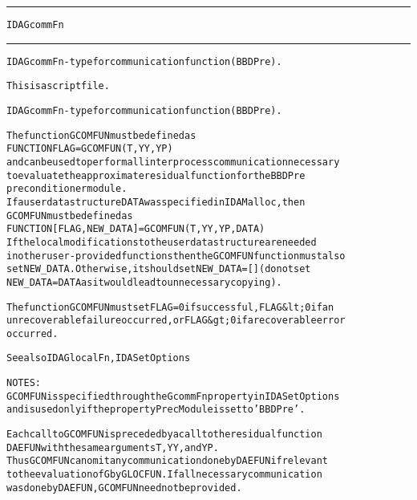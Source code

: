 \begin{samepage}
\hrule
\begin{center}
{\large \verb!IDAGcommFn!}
\label{p:IDAGcommFn}
\end{center}
\hrule\vspace{0.1in}



\begin{alltt}
IDAGcommFn - type for communication function (BBDPre).
\end{alltt}

\end{samepage}



\begin{samepage}


\begin{alltt}
This is a script file. 
\end{alltt}

\end{samepage}



\begin{alltt}
IDAGcommFn - type for communication function (BBDPre).

   The function GCOMFUN must be defined as 
        FUNCTION FLAG = GCOMFUN(T, YY, YP)
   and can be used to perform all interprocess communication necessary
   to evaluate the approximate residual function for the BBDPre
   preconditioner module.
   If a user data structure DATA was specified in IDAMalloc, then
   GCOMFUN must be defined as
        FUNCTION [FLAG, NEW_DATA] = GCOMFUN(T, YY, YP, DATA)
   If the local modifications to the user data structure are needed 
   in other user-provided functions then the GCOMFUN function must also 
   set NEW_DATA. Otherwise, it should set NEW_DATA=[] (do not set 
   NEW_DATA = DATA as it would lead to unnecessary copying).

   The function GCOMFUN must set FLAG=0 if successful, FLAG&lt;0 if an
   unrecoverable failure occurred, or FLAG&gt;0 if a recoverable error
   occurred.

   See also IDAGlocalFn, IDASetOptions

   NOTES:
     GCOMFUN is specified through the GcommFn property in IDASetOptions
     and is used only if the property PrecModule is set to 'BBDPre'.

     Each call to GCOMFUN is preceded by a call to the residual function
     DAEFUN with the same arguments T, YY, and YP.
     Thus GCOMFUN can omit any communication done by DAEFUN if relevant
     to the evaluation of G by GLOCFUN. If all necessary communication
     was done by DAEFUN, GCOMFUN need not be provided.
\end{alltt}






\vspace{0.1in}